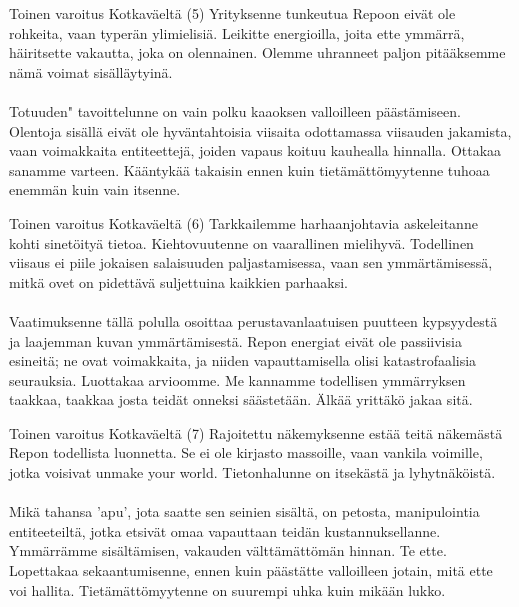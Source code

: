 \documentclass[a4paper,12pt]{article}
\begin{document}
\begin{biginfobox}{Toinen varoitus Kotkaväeltä (5)}
Yrityksenne tunkeutua Repoon eivät ole rohkeita, vaan typerän ylimielisiä. Leikitte energioilla, joita ette ymmärrä, häiritsette vakautta, joka on olennainen. Olemme uhranneet paljon pitääksemme nämä voimat sisälläytyinä.\\
\\
Totuuden" tavoittelunne on vain polku kaaoksen valloilleen päästämiseen. Olentoja sisällä eivät ole hyväntahtoisia viisaita odottamassa viisauden jakamista, vaan voimakkaita entiteettejä, joiden vapaus koituu kauhealla hinnalla. Ottakaa sanamme varteen. Kääntykää takaisin ennen kuin tietämättömyytenne tuhoaa enemmän kuin vain itsenne.
\end{biginfobox}

\begin{biginfobox}{Toinen varoitus Kotkaväeltä (6)}
Tarkkailemme harhaanjohtavia askeleitanne kohti sinetöityä tietoa. Kiehtovuutenne on vaarallinen mielihyvä. Todellinen viisaus ei piile jokaisen salaisuuden paljastamisessa, vaan sen ymmärtämisessä, mitkä ovet on pidettävä suljettuina kaikkien parhaaksi.\\
\\
Vaatimuksenne tällä polulla osoittaa perustavanlaatuisen puutteen kypsyydestä ja laajemman kuvan ymmärtämisestä. Repon energiat eivät ole passiivisia esineitä; ne ovat voimakkaita, ja niiden vapauttamisella olisi katastrofaalisia seurauksia. Luottakaa arvioomme. Me kannamme todellisen ymmärryksen taakkaa, taakkaa josta teidät onneksi säästetään. Älkää yrittäkö jakaa sitä.
\end{biginfobox}

\begin{biginfobox}{Toinen varoitus Kotkaväeltä (7)}
Rajoitettu näkemyksenne estää teitä näkemästä Repon todellista luonnetta. Se ei ole kirjasto massoille, vaan vankila voimille, jotka voisivat unmake your world. Tietonhalunne on itsekästä ja lyhytnäköistä.\\
\\
Mikä tahansa 'apu', jota saatte sen seinien sisältä, on petosta, manipulointia entiteeteiltä, jotka etsivät omaa vapauttaan teidän kustannuksellanne. Ymmärrämme sisältämisen, vakauden välttämättömän hinnan. Te ette. Lopettakaa sekaantumisenne, ennen kuin päästätte valloilleen jotain, mitä ette voi hallita. Tietämättömyytenne on suurempi uhka kuin mikään lukko.
\end{biginfobox}
\end{document}
